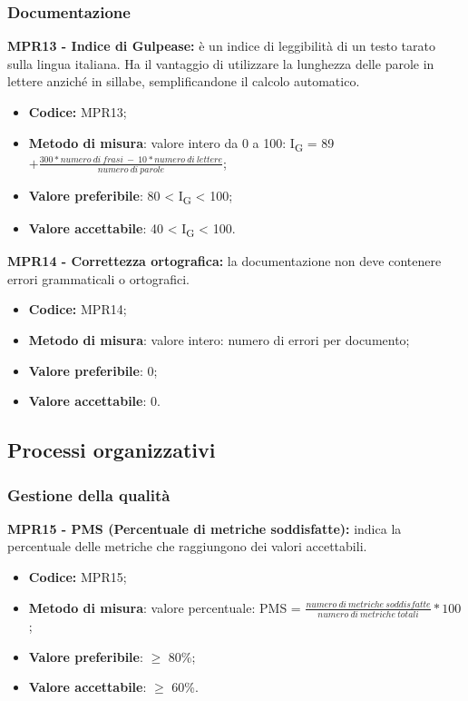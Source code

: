 \subsubsection{Documentazione}
\textbf{MPR13 - Indice di Gulpease:} è un indice di leggibilità di un testo tarato sulla lingua italiana. 
Ha il vantaggio di utilizzare la lunghezza delle parole in lettere anziché in sillabe, semplificandone il calcolo automatico. 
\begin{itemize}
    \item \textbf{Codice:} MPR13;
    \item \textbf{Metodo di misura}: valore intero da 0 a 100: I\textsubscript{G} = 89 $+ \frac{300*numero \ di \ frasi \ - \ 10*numero \ di \ lettere}{numero \ di \ parole}$;
    \item \textbf{Valore preferibile}: 80 < I\textsubscript{G} < 100;
    \item \textbf{Valore accettabile}: 40 < I\textsubscript{G} < 100.
\end{itemize}
\textbf{MPR14 - Correttezza ortografica:} la documentazione non deve contenere errori grammaticali o ortografici. 
\begin{itemize}
    \item \textbf{Codice:} MPR14;
    \item \textbf{Metodo di misura}: valore intero: numero di errori per documento;
    \item \textbf{Valore preferibile}: 0;
    \item \textbf{Valore accettabile}: 0.
\end{itemize}
\subsection{Processi organizzativi}
\subsubsection{Gestione della qualità}
\textbf{MPR15 - PMS (Percentuale di metriche soddisfatte):} indica la percentuale delle metriche che raggiungono dei valori accettabili.
\begin{itemize}
    \item \textbf{Codice:} MPR15;
    \item \textbf{Metodo di misura}: valore percentuale: PMS = $\frac{numero \ di \ metriche \ soddisfatte}{numero \ di \ metriche \ totali} * 100$ ;
    \item \textbf{Valore preferibile}: $\geq$ 80\%;
    \item \textbf{Valore accettabile}: $\geq$ 60\%.
\end{itemize}
\newpage
